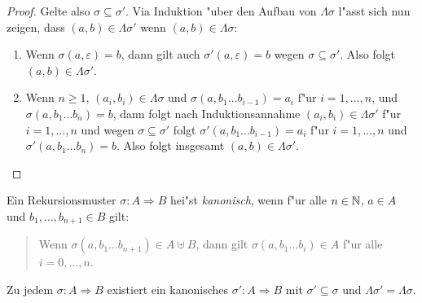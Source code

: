 \documentclass[12pt,a4paper]{article}
\begin{document}
\begin{proof}
  Gelte also $\sigma \subseteq \sigma'$. Via Induktion "uber den Aufbau von $\Lambda\sigma$ l"asst sich nun zeigen,
  dass $(a,b) \in \Lambda \sigma'$ wenn $(a,b) \in \Lambda \sigma$:
  \begin{enumerate}
  \item Wenn $\sigma(a,\varepsilon) = b$, dann gilt auch $\sigma'(a,\varepsilon)=b$ wegen
    $\sigma\subseteq\sigma'$. Also folgt $(a,b) \in \Lambda \sigma'$.
  \item Wenn $n \ge 1$, $(a_i,b_i) \in \Lambda \sigma$ und $\sigma(a,b_1 \ldots b_{i-1})=a_i$ f"ur $i=1,\ldots,n$,
    und $\sigma(a,b_1 \ldots b_n) = b$, dann folgt nach Induktionsannahme $(a_i,b_i)\in\Lambda \sigma'$
    f"ur $i=1,\ldots,n$ und wegen $\sigma \subseteq \sigma'$ folgt $\sigma'(a,b_1 \ldots b_{i-1})=a_i$
    f"ur $i=1,\ldots,n$ und $\sigma'(a,b_1 \ldots b_n) =b$. Also folgt insgesamt $(a,b) \in \Lambda \sigma'$.
  \end{enumerate}
\end{proof}

\begin{definition}
  Ein Rekursionsmuster $\sigma: A \Rightarrow B$ hei"st \emph{kanonisch}, wenn
  f"ur alle $n \in \mathbb N$, $a \in A$ und $b_1,\ldots,b_{n+1} \in B$ gilt:
  \begin{quote}
    Wenn $\sigma(a,b_1 \ldots b_{n+1}) \in A \uplus B$, dann gilt
    $\sigma(a,b_1 \ldots b_i) \in A$ f"ur alle $i = 0,\ldots,n$.
  \end{quote}
\end{definition}

\begin{lemma}
  Zu jedem $\sigma: A \Rightarrow B$ existiert ein kanonisches $\sigma':A \Rightarrow B$ mit
  $\sigma' \subseteq \sigma$ und $\Lambda \sigma' = \Lambda \sigma$.
\end{lemma}
\end{document}

